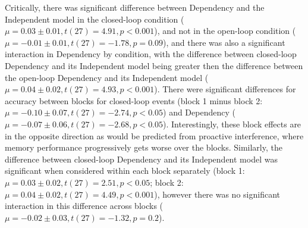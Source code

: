 \documentclass[11pt, titlepage, twoside]{article}
\providecommand{\DIFadd}[1]{{\protect\color{blue}\uwave{#1}}} %
\providecommand{\DIFaddbegin}{} %
\begin{document}
Critically, there was significant difference between Dependency and the Independent model in the closed-loop condition ($\mu=0.03\pm0.01, t(27)=4.91, p<0.001$), and not in the open-loop condition ($\mu=-0.01\pm0.01, t(27)=-1.78, p=0.09$), and there was also a significant interaction in Dependency by condition, with the difference between closed-loop Dependency and its Independent model being greater then the difference between the open-loop Dependency and its Independent model ($\mu=0.04\pm0.02, t(27)=4.93, p<0.001$).  There were significant differences for accuracy between blocks for closed-loop events (block 1 minus block 2: $\mu=-0.10\pm0.07, t(27)=-2.74, p<0.05$) and Dependency ($\mu=-0.07\pm0.06, t(27)=-2.68, p<0.05$).  Interestingly, these block effects are in the opposite direction as would be predicted from proactive interference, where memory performance progressively gets worse over the blocks.  Similarly, the difference between closed-loop Dependency and its Independent model was significant when considered within each block separately (block 1: $\mu=0.03\pm0.02, t(27)=2.51, p<0.05$; block 2: $\mu=0.04\pm0.02, t(27)=4.49, p<0.001$), however there was no significant interaction in this difference across blocks ($\mu=-0.02\pm0.03, t(27)=-1.32, p=0.2$).


\DIFaddbegin \subsection{\DIFadd{EEG Results}}\label{sec:eegresults}
\end{document}
